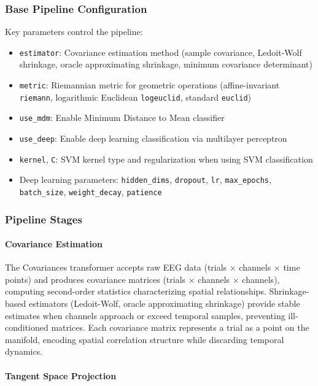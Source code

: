 \documentclass[12pt]{report}
\begin{document}
\subsubsection{Base Pipeline Configuration}

Key parameters control the pipeline:
\begin{itemize}
  \item \verb|estimator|: Covariance estimation method (sample covariance, Ledoit-Wolf shrinkage, oracle approximating shrinkage, minimum covariance determinant)
  \item \verb|metric|: Riemannian metric for geometric operations (affine-invariant \verb|riemann|, logarithmic Euclidean \verb|logeuclid|, standard \verb|euclid|)
  \item \verb|use_mdm|: Enable Minimum Distance to Mean classifier
  \item \verb|use_deep|: Enable deep learning classification via multilayer perceptron
  \item \verb|kernel|, \verb|C|: SVM kernel type and regularization when using SVM classification
  \item Deep learning parameters: \verb|hidden_dims|, \verb|dropout|, \verb|lr|, \verb|max_epochs|, \verb|batch_size|, \verb|weight_decay|, \verb|patience|
\end{itemize}

\subsubsection{Pipeline Stages}

\paragraph{Covariance Estimation}\mbox{}

The Covariances transformer accepts raw EEG data (trials $\times$ channels $\times$ time points) and produces covariance matrices (trials $\times$ channels $\times$ channels), computing second-order statistics characterizing spatial relationships. Shrinkage-based estimators (Ledoit-Wolf, oracle approximating shrinkage) provide stable estimates when channels approach or exceed temporal samples, preventing ill-conditioned matrices. Each covariance matrix represents a trial as a point on the manifold, encoding spatial correlation structure while discarding temporal dynamics.

\paragraph{Tangent Space Projection}\mbox{}
\end{document}
